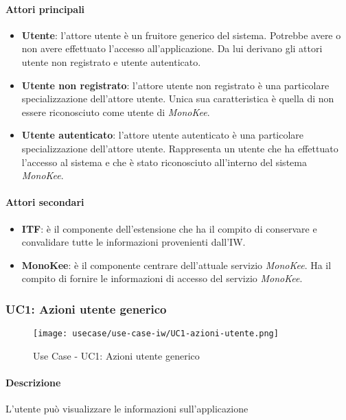 \paragraph{Attori principali}
\begin{itemize}
    \item \textbf{Utente}: l’attore utente è un fruitore generico del sistema. Potrebbe avere o non avere effettuato l’accesso all’applicazione. Da lui derivano gli attori utente non registrato e utente autenticato.	
    \item \textbf{Utente non registrato}: l’attore utente non registrato è una particolare specializzazione dell’attore utente. Unica sua caratteristica è quella di non essere riconosciuto come utente di \textit{MonoKee}.
    \item \textbf{Utente autenticato}: l’attore utente autenticato è una particolare specializzazione dell’attore utente. Rappresenta un utente che ha effettuato l’accesso al sistema e che è stato riconosciuto all’interno del sistema \textit{MonoKee}.
\end{itemize}
      
\paragraph{Attori secondari}
\begin{itemize}
    \item \textbf{ITF}: è il componente dell’estensione che ha il compito di conservare e convalidare tutte le informazioni provenienti dall’IW.
    \item \textbf{MonoKee}: è il componente centrare dell’attuale servizio \textit{MonoKee}. Ha il compito di fornire le informazioni di accesso del servizio \textit{MonoKee}. 
\end{itemize}
    


\subsubsection{UC1: Azioni utente generico}
\begin{figure}[!htbp] 
    \centering 
    \texttt{[image: usecase/use-case-iw/UC1-azioni-utente.png]} 
    \caption{Use Case - UC1: Azioni utente generico}
\end{figure}

\paragraph{Descrizione}  L’utente può visualizzare le informazioni sull’applicazione 
